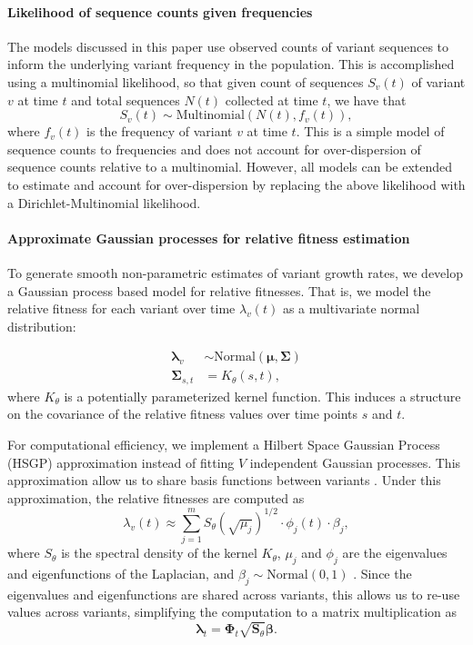 \documentclass[11pt,oneside,letterpaper]{article}
\renewcommand{\vec}[1]{\boldsymbol{#1}}
\begin{document}
\paragraph{Likelihood of sequence counts given frequencies}

The models discussed in this paper use observed counts of variant sequences to inform the underlying variant frequency in the population.
This is accomplished using a multinomial likelihood, so that given count of sequences $S_{v}(t)$ of variant $v$ at time $t$ and total sequences $N(t)$ collected at time $t$, we have that
\begin{equation*}
    S_{v}(t) \sim \text{Multinomial}(N(t), f_{v}(t)),
\end{equation*}
where $f_{v}(t)$ is the frequency of variant $v$ at time $t$.
This is a simple model of sequence counts to frequencies and does not account for over-dispersion of sequence counts relative to a multinomial.
However, all models can be extended to estimate and account for over-dispersion by replacing the above likelihood with a Dirichlet-Multinomial likelihood.

\paragraph{Approximate Gaussian processes for relative fitness estimation}

To generate smooth non-parametric estimates of variant growth rates, we develop a Gaussian process based model for relative fitnesses.
That is, we model the relative fitness for each variant over time $\lambda_v(t)$ as a multivariate normal distribution:

\begin{align*}
    \vec{\lambda}_{v} &\sim \text{Normal}(\vec{\mu}, \vec{\Sigma})\\
    \vec{\Sigma}_{s, t} &= K_{\theta}(s, t),
\end{align*}
where $K_{\theta}$ is a potentially parameterized kernel function.
This induces a structure on the covariance of the relative fitness values over time points $s$ and $t$.

For computational efficiency, we implement a Hilbert Space Gaussian Process (HSGP) approximation instead of fitting $V$ independent Gaussian processes.
This approximation allow us to share basis functions between variants \cite{riutortmayol2022practical}.
Under this approximation, the relative fitnesses are computed as
\begin{equation}
    \lambda_{v}(t) \approx \sum_{j=1}^{m} S_{\theta}(\sqrt{\mu_{j}})^{1/2} \cdot \phi_{j}(t) \cdot \beta_{j},
\end{equation}
where $S_{\theta}$ is the spectral density of the kernel $K_\theta$, $\mu_{j}$ and $\phi_{j}$ are the eigenvalues and eigenfunctions of the Laplacian, and $\beta_{j} \sim \text{Normal}(0,1)$ \cite{riutortmayol2022practical}.
Since the eigenvalues and eigenfunctions are shared across variants, this allows us to re-use values across variants, simplifying the computation to a matrix multiplication as
\begin{equation*}
    \vec{\lambda}_{t} = \vec{\Phi}_{t} \sqrt{\vec{S}_{\theta}}\vec{\beta}.
\end{equation*}
\end{document}
